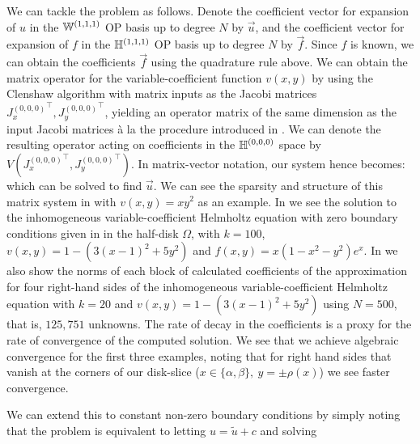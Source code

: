 We can tackle the problem as follows. Denote the coefficient vector for expansion of $u$ in the ${\mathbb{W}^{(1,1,1)}}$ OP basis up to degree $N$ by $\vec{u}$, and the coefficient vector for expansion of $f$ in the ${\mathbb{H}^{(1,1,1)}}$ OP basis up to degree $N$ by $\vec{f}$. Since $f$ is known, we can obtain  the coefficients $\vec{f}$ using the quadrature rule above. We can obtain the matrix operator for the variable-coefficient function $v(x,y)$ by using the Clenshaw algorithm with matrix inputs as the Jacobi matrices ${J_x^{(0,0,0)}}^\top, {J_y^{(0,0,0)}}^\top$, yielding an operator matrix of the same dimension as the input Jacobi matrices \`a la the procedure introduced in \cite{olver2019triangle}. We can denote the resulting operator acting on coefficients in the ${\mathbb{H}^{(0,0,0)}}$ space by $V({J_x^{(0,0,0)}}^\top, {J_y^{(0,0,0)}}^\top)$. In matrix-vector notation, our system hence becomes:
which can be solved to find $\vec{u}$. We can see the sparsity and structure of this matrix system in  with $v(x,y) = xy^2$ as an example. In  we see the solution to the inhomogeneous variable-coefficient Helmholtz equation with zero boundary conditions given in  in the half-disk $\Omega$, with $k=100$, $v(x,y) = 1 - (3(x-1)^2 + 5y^2)$ and $f(x,y) = x(1-x^2-y^2)e^x$. In  we also show the norms of each block of calculated coefficients of the approximation for four right-hand sides of the inhomogeneous variable-coefficient Helmholtz equation with $k=20$ and $v(x,y) = 1 - (3(x-1)^2 + 5y^2)$ using $N = 500$, that is, $125,751$ unknowns. The rate of decay in the coefficients is a proxy for the rate of convergence of the computed solution. We see that we achieve algebraic convergence for the first three examples, noting that for right hand sides that vanish at the corners of our disk-slice ($x\in\{\alpha,\beta\}, \: y = \pm \rho(x)$) we see faster convergence.


We can extend this to constant non-zero boundary conditions by simply noting that the problem 
is equivalent to letting $u = \tilde{u} + c$ and solving



